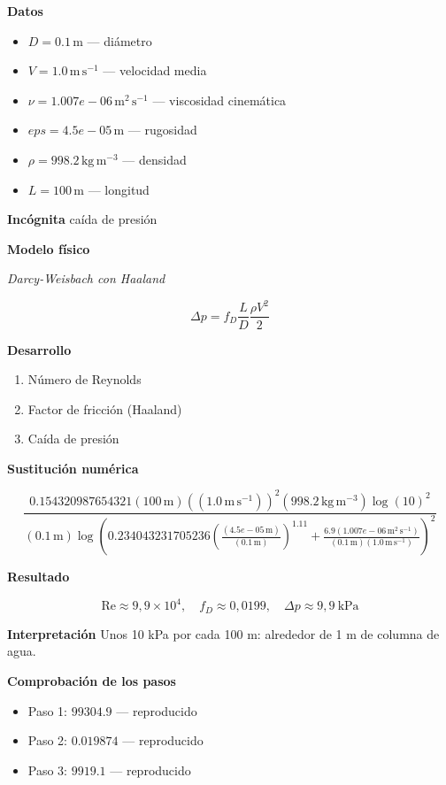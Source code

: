\documentclass[10pt,openany]{book}
\begin{document}
\noindent\textbf{Datos}
\begin{itemize}
\item $D = 0.1\,\mathrm{m}$ — diámetro
\item $V = 1.0\,\mathrm{m}\,\mathrm{s}^{-1}$ — velocidad media
\item $\nu = 1.007e-06\,\mathrm{m}^{2}\,\mathrm{s}^{-1}$ — viscosidad cinemática
\item $eps = 4.5e-05\,\mathrm{m}$ — rugosidad
\item $\rho = 998.2\,\mathrm{kg}\,\mathrm{m}^{-3}$ — densidad
\item $L = 100\,\mathrm{m}$ — longitud
\end{itemize}

\noindent\textbf{Incógnita}
caída de presión

\noindent\textbf{Modelo físico}

\noindent\textit{Darcy-Weisbach con Haaland}

\[
\Delta p = f_D\frac{L}{D}\frac{\rho V^{2}}{2}
\]

\noindent\textbf{Desarrollo}
\begin{enumerate}
\item
Número de Reynolds
\item
Factor de fricción (Haaland)
\item
Caída de presión
\end{enumerate}

\noindent\textbf{Sustitución numérica}

\[
\frac{0.154320987654321 \left(100\,\mathrm{m}\right) \left(\left(1.0\,\mathrm{m}\,\mathrm{s}^{-1}\right)\right)^{2} \left(998.2\,\mathrm{kg}\,\mathrm{m}^{-3}\right) \log{\left(10 \right)}^{2}}{\left(0.1\,\mathrm{m}\right) \log{\left(0.234043231705236 \left(\frac{\left(4.5e-05\,\mathrm{m}\right)}{\left(0.1\,\mathrm{m}\right)}\right)^{1.11} + \frac{6.9 \left(1.007e-06\,\mathrm{m}^{2}\,\mathrm{s}^{-1}\right)}{\left(0.1\,\mathrm{m}\right) \left(1.0\,\mathrm{m}\,\mathrm{s}^{-1}\right)} \right)}^{2}}
\]

\noindent\textbf{Resultado}

\[
\mathrm{Re} \approx 9{,}9\times 10^{4},\quad f_D \approx 0{,}0199,\quad \Delta p \approx 9{,}9\ \mathrm{kPa}
\]

\noindent\textbf{Interpretación}
Unos 10 kPa por cada 100 m: alrededor de 1 m de columna de agua.

\noindent\textbf{Comprobación de los pasos}
\begin{itemize}
\item Paso 1: $99304.9$ — reproducido
\item Paso 2: $0.019874$ — reproducido
\item Paso 3: $9919.1$ — reproducido
\end{itemize}
\end{document}
